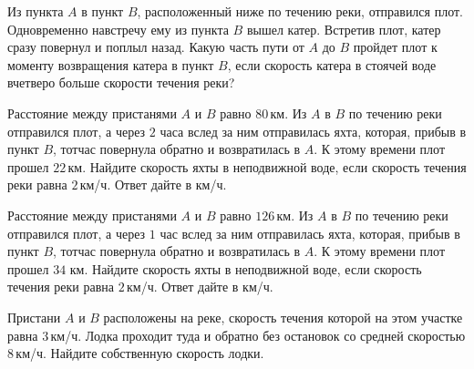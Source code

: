 \begin{class}[number=3]
\begin{listofex}
		\item Из пункта \( A \) в пункт \( B \), расположенный ниже по течению реки, отправился плот. Одновременно навстречу ему из пункта \( B \) вышел катер. Встретив плот, катер сразу повернул и поплыл назад. Какую часть пути от \( A \) до \( B \) пройдет плот к моменту возвращения катера в пункт \( B \), если скорость катера в стоячей воде вчетверо больше скорости течения реки?
		\item Расстояние между пристанями \( A \) и \( B \) равно \( 80 \) км. Из \( A \) в \( B \) по течению реки отправился плот, а через \( 2 \) часа вслед за ним отправилась яхта, которая, прибыв в пункт \( B \), тотчас повернула обратно и возвратилась в \( A \). К этому времени плот прошел \( 22 \) км. Найдите скорость яхты в неподвижной воде, если скорость течения реки равна \( 2 \) км/ч. Ответ дайте в км/ч.
		\item Расстояние между пристанями \( A \) и \( B \) равно \( 126 \) км. Из \( A \) в \( B \) по течению реки отправился плот, а через \( 1 \) час вслед за ним отправилась яхта, которая, прибыв в пункт \( B \), тотчас повернула обратно и возвратилась в \( A \). К этому времени плот прошел \( 34  \) км. Найдите скорость яхты в неподвижной воде, если скорость течения реки равна \( 2 \) км/ч. Ответ дайте в км/ч.
		\item Пристани \( A \) и \( B \) расположены на реке, скорость течения которой на этом участке равна \( 3 \) км/ч. Лодка проходит туда и обратно без остановок со средней скоростью \( 8 \) км/ч. Найдите собственную скорость лодки.
	\end{listofex}
\end{class}

